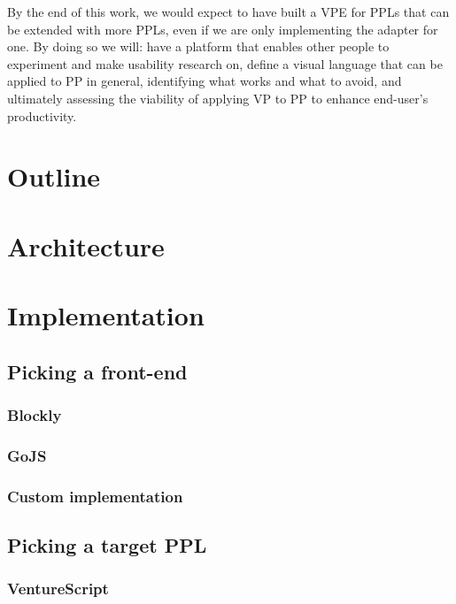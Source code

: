 By the end of this work, we would expect to have built a VPE for PPLs that can
be extended with more PPLs, even if we are only implementing the adapter for one.
By doing so we will: have a platform that enables other people to experiment
and make usability research on, define a visual language that can be applied to PP in general,
identifying what works and what to avoid,
and ultimately assessing the viability of applying VP to PP to enhance end-user's
productivity.

\section{Outline}

\section{Architecture}

\section{Implementation}


\subsection{Picking a front-end}

\subsubsection{Blockly}

\subsubsection{GoJS}

\subsubsection{Custom implementation}

\subsection{Picking a target PPL}

\subsubsection{VentureScript}

